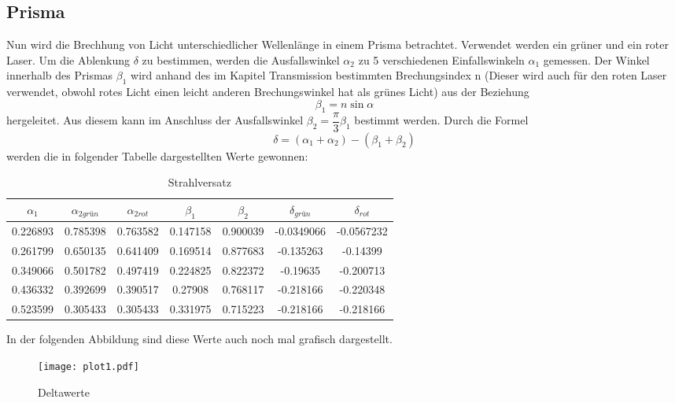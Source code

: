 \subsection{Prisma}
  Nun wird die Brechhung von Licht unterschiedlicher Wellenlänge in einem Prisma betrachtet.
  Verwendet werden ein grüner und ein roter Laser. Um die Ablenkung $\delta$ zu bestimmen,
  werden die Ausfallswinkel $\alpha_2$ zu 5 verschiedenen Einfallswinkeln $\alpha_1$ gemessen.
  Der Winkel innerhalb des Prismas $\beta_1$ wird anhand des im Kapitel Transmission bestimmten 
  Brechungsindex n (Dieser wird auch für den roten Laser verwendet, obwohl rotes Licht einen
  leicht anderen Brechungswinkel hat als grünes Licht) aus der Beziehung 
  \begin{equation*}
    \beta_1=n\sin{\alpha}
  \end{equation*}
  hergeleitet. Aus diesem kann im Anschluss der Ausfallswinkel $\beta_2=\dfrac{\pi}{3}\beta_1$
  bestimmt werden. 
  Durch die Formel
  \begin{equation*}
    \delta = (\alpha_1+\alpha_2)-(\beta_1+\beta_2)
  \end{equation*}
  werden die in folgender Tabelle dargestellten Werte gewonnen:
  \begin{table}[H]
    \centering
    \caption{Strahlversatz}
    \begin{tabular}{c c c c c c c}
      \toprule
      $\alpha_1$ & $\alpha_{2grün} $  & $\alpha_{2rot}$ & $\beta_1$ & $\beta_2$ & $\delta_{grün}$& $\delta_{rot}$\\
      \midrule
      0.226893 & 0.785398 & 0.763582 & 0.147158 & 0.900039 & -0.0349066 & -0.0567232 \\
      0.261799 & 0.650135 & 0.641409 & 0.169514 & 0.877683 & -0.135263  & -0.14399   \\
      0.349066 & 0.501782 & 0.497419 & 0.224825 & 0.822372 & -0.19635   & -0.200713  \\
      0.436332 & 0.392699 & 0.390517 & 0.27908  & 0.768117 & -0.218166  & -0.220348  \\
      0.523599 & 0.305433 & 0.305433 & 0.331975 & 0.715223 & -0.218166  & -0.218166  \\
      \bottomrule
    \end{tabular}
  \end{table}
  In der folgenden Abbildung sind diese Werte auch noch mal grafisch dargestellt.
  \begin{figure}[H]
    \centering
    \texttt{[image: plot1.pdf]}
    \caption{Deltawerte}
    \label{fig:plot}
  \end{figure}

